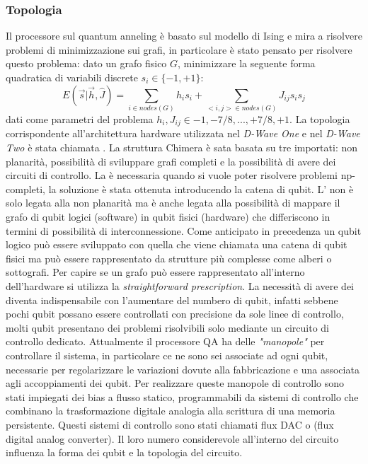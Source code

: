 \subsubsection{Topologia}
Il processore sul quantum anneling è basato sul modello di Ising e mira a risolvere problemi di minimizzazione sui grafi, in particolare è stato pensato per risolvere questo problema: dato un grafo fisico $G$, minimizzare la seguente forma quadratica di variabili discrete $s_i \in \{-1, +1\}$:
$$E(\vec{s}|\vec{h}, \hat{J}) = \sum_{i \in nodes(G)} h_i s_i + \sum_{<i,j> \in nodes(G)} J_{ij} s_i s_j$$
dati come parametri del problema $h_i, J_{ij} \in {-1, -7/8, ..., +7/8, +1}$. La topologia corrispondente all'architettura hardware utilizzata nel \textit{D-Wave One} e nel \textit{D-Wave Two} è stata chiamata . La struttura Chimera è sata basata su tre  importati: non planarità, possibilità di sviluppare grafi completi e la possibilità di avere dei circuiti di controllo. La  è necessaria quando si vuole poter risolvere problemi np-completi, la soluzione è stata ottenuta introducendo la catena di qubit. L' non è solo legata alla non planarità ma è anche legata alla possibilità di mappare il grafo di qubit logici (software) in qubit fisici (hardware) che differiscono in termini di possibilità di interconnessione. Come anticipato in precedenza un qubit logico può essere sviluppato con quella che viene chiamata una catena di qubit fisici ma può essere rappresentato da strutture più complesse come alberi o sottografi. Per capire se un grafo può essere rappresentato all'interno dell'hardware si utilizza la \textit{straightforward prescription}.
La necessità di avere dei  diventa indispensabile con l'aumentare del numbero di qubit, infatti sebbene pochi qubit possano essere controllati con precisione da sole linee di controllo, molti qubit presentano dei problemi risolvibili solo mediante un circuito di controllo dedicato. Attualmente il processore QA ha delle \textit{"manopole"} per controllare il sistema, in particolare ce ne sono sei associate ad ogni qubit, necessarie per regolarizzare le variazioni dovute alla fabbricazione e una associata agli accoppiamenti dei qubit. Per realizzare queste manopole di controllo sono stati impiegati dei bias a flusso statico, programmabili da sistemi di controllo che combinano la trasformazione digitale analogia alla scrittura di una memoria persistente. Questi sistemi di controllo sono stati chiamati flux DAC o  (flux digital analog converter). Il loro numero considerevole all'interno del circuito influenza la forma dei qubit e la topologia del circuito.
